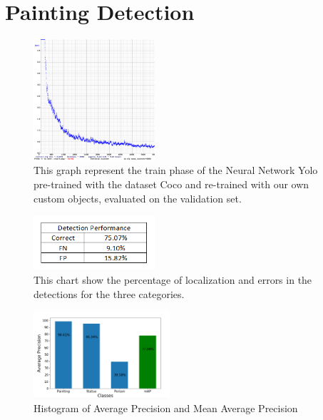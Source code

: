 \section{Painting Detection}

\begin{figure}
    \centering
        \includegraphics[width=0.4\textwidth]{pictures/painting_detection/chart.png}
    \caption{This graph represent the train phase of the Neural Network Yolo pre-trained with the dataset Coco and re-trained with our own custom objects, evaluated on the validation set.}
    \label{fig:figura1}
\end{figure}

\begin{figure}
    \centering
        \includegraphics[width=0.4\textwidth]{pictures/painting_detection/tabella1.png}
    \caption{This chart show the percentage of localization and  errors in the detections for the three categories.}
    \label{fig:figura2}
\end{figure}

\begin{figure}[h] 
    \centering
        \includegraphics[width=0.45\textwidth]{pictures/painting_detection/performance2.png}
    \caption{Histogram of Average Precision and Mean Average Precision}
    \label{fig:figura3}
\end{figure} 


